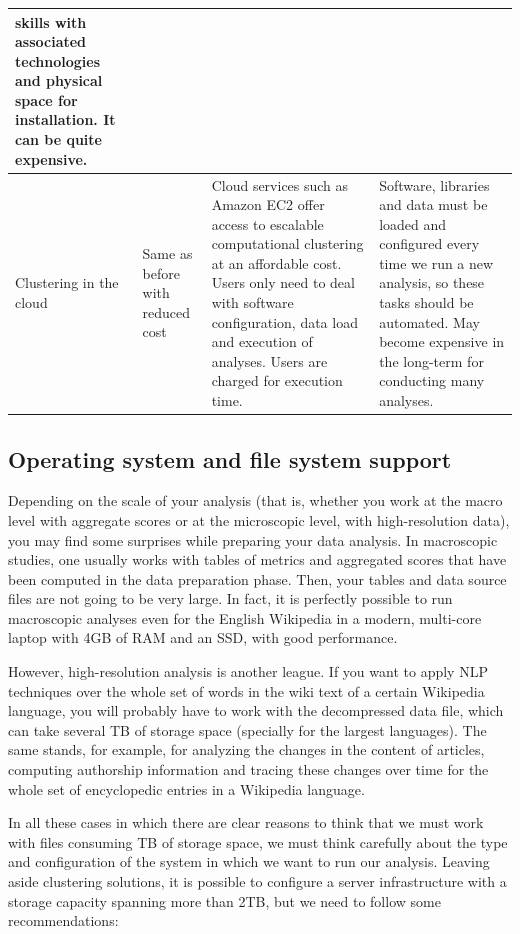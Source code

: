 \begin{longtable}[l]{|m{2.5cm}|m{3cm}|m{5cm}|m{4cm}|}
  skills with associated technologies and physical space for installation. 
  It can be quite expensive.\\
  \hline
  Clustering in the cloud & Same as before with reduced cost & Cloud services such
  as Amazon EC2 offer access to escalable computational clustering at an affordable cost.
  Users only need to deal with software configuration, data load and execution of
  analyses. Users are charged for execution time. & Software, libraries and data 
  must be loaded and configured every time
  we run a new analysis, so these tasks should be automated. May become expensive
  in the long-term for conducting many analyses.\\
  \hline
\end{longtable}

\subsection{Operating system and file system support}
Depending on the scale of your analysis (that is, whether you work at the macro
level with aggregate scores or at the microscopic level, with high-resolution data),
you may find some surprises while preparing your data analysis. In macroscopic
studies, one usually works with tables of metrics and aggregated scores that
have been computed in the data preparation phase. Then, your tables and data
source files are not going to be very large. In fact, it is perfectly possible to
run macroscopic analyses even for the English Wikipedia in a modern, multi-core
laptop with 4GB of RAM and an SSD, with good performance.

However, high-resolution analysis is another league. If you want to apply NLP techniques
over the whole set of words in the wiki text of a certain Wikipedia language, you will
probably have to work with the decompressed data file, which can take several
TB of storage space (specially for the largest languages). The same stands, for example,
for analyzing the changes in the content of articles, computing authorship information
and tracing these changes over time for the whole set of encyclopedic entries in
a Wikipedia language.

In all these cases in which there are clear reasons to think that we must work with
files consuming TB of storage space, we must think carefully about the type and configuration
of the system in which we want to run our analysis. Leaving aside clustering
solutions, it is possible to configure a server infrastructure with a storage capacity
spanning more than 2TB, but we need to follow some recommendations:

